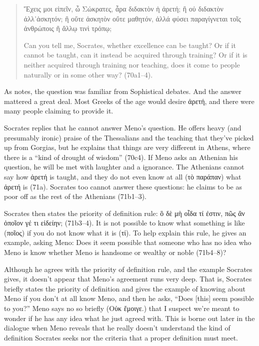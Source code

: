 \documentclass[12pt,letterpaper]{article}
\begin{document}
\begin{quote}
    \begin{greek}Ἔχεις μοι εἰπεῖν, ὦ Σώκρατες, ἆρα διδακτὸν ἡ ἀρετή; ἢ οὐ διδακτὸν ἀλλ᾽ἀσκητόν; ἢ οὔτε ἀσκητὸν οὔτε μαθητόν, ἀλλά φύσει παραγίγνεται τοῖς ἀνθρώποις ἢ ἄλλῳ τινὶ τρόπῳ;\end{greek}
    
   Can you tell me, Socrates, whether excellence can be taught? Or if it cannot be taught, can it instead be acquired through training? Or if it is neither acquired through training nor teaching, does it come to people naturally or in some other way? (70a1--4).
\end{quote}

As \textcite[4]{nehamas1985} notes, the question was familiar from Sophistical debates. And the answer mattered a great deal. Most Greeks of the age would desire \textgreek{ἀρετή}, and there were many people claiming to provide it.

Socrates replies that he cannot answer Meno's question. He offers heavy (and presumably ironic) praise of the Thessalians and the teaching that they've picked up from Gorgias, but he explains that things are very different in Athens, where there is a ``kind of drought of wisdom'' (70c4). If Meno asks an Athenian his question, he will be met with laughter and a ignorance. The Athenians cannot say how ἀρετή is taught, and they do not even know at all (\textgreek{τὸ παράπαν}) what \textgreek{ἀρετή} is (71a). Socrates too cannot answer these questions: he claims to be as poor off as the rest of the Athenians (71b1--3). 

Socrates then states the priority of definition rule: \textgreek{ὃ δὲ μὴ οἶδα τί ἐστιν, πῶς ἂν ὁποῖον γέ τι εἰδείην;} (71b3--4). It is not possible to know what something is like (\textgreek{ποῖος}) if you do not know what it is (\textgreek{τί}). To help explain this rule, he gives an example, asking Meno: Does it seem possible that someone who has no idea who Meno is know whether Meno is handsome or wealthy or noble (71b4--8)?

Although he agrees with the priority of definition rule, and the example Socrates gives, it doesn't appear that Meno's agreement runs very deep. That is, Socrates briefly states the priority of definition and gives the example of knowing about Meno if you don't at all know Meno, and then he asks, ``Does [this] seem possible to you?'' Meno says no so briefly (\textgreek{Οὐκ ἔμοιγε.}) that I suspect we're meant to wonder if he has any idea what he just agreed with. This is borne out later in the dialogue when Meno reveals that he really doesn't understand the kind of definition Socrates seeks nor the criteria that a proper definition must meet.
\end{document}
